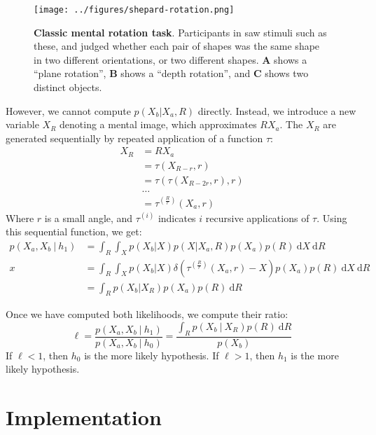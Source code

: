 \documentclass{article} %
\begin{document}
\begin{figure}[t]
  \centering
  \texttt{[image: ../figures/shepard-rotation.png]}
  \caption{\textbf{Classic mental rotation task}. Participants in
    \cite{Shepard1971} saw stimuli such as these, and judged whether
    each pair of shapes was the same shape in two different
    orientations, or two different shapes. \textbf{A} shows a ``plane
    rotation'', \textbf{B} shows a ``depth rotation'', and \textbf{C}
    shows two distinct objects.}
  \label{fig:mental-rotation}
\end{figure}

However, we cannot compute $p(X_b\vert X_a, R)$ directly. Instead, we
introduce a new variable $X_R$ denoting a mental image, which
approximates $RX_a$. The $X_R$ are generated sequentially by repeated
application of a function $\tau$:
\begin{align}
  X_R&=RX_a\nonumber \\
  &=\tau(X_{R-r}, r)\nonumber \\
  &=\tau(\tau(X_{R-2r}, r), r)\nonumber \\
  &\ldots{}\nonumber \\
  &=\tau^{(\frac{R}{r})}(X_a, r)
  \label{eq:tau}
\end{align} 
Where $r$ is a small angle, and $\tau^{(i)}$ indicates $i$ recursive
applications of $\tau$. Using this sequential function, we get:
\begin{align}
  p(X_a, X_b\ \vert \ h_1)&=\int_R \int_{X} p(X_b\vert X) p(X\vert X_a, R)p(X_a)p(R)\ \mathrm{d}X\ \mathrm{d}R \nonumber \\
  x&= \int_R \int_X p(X_b\vert X)\delta(\tau^{(\frac{R}{r})}(X_a, r)-X)p(X_a)p(R)\ \mathrm{d}X\ \mathrm{d}R \nonumber \\
  &= \int_R p(X_b\vert X_R)p(X_a)p(R)\ \mathrm{d}R
  \label{eq:lh-h1}
\end{align}

Once we have computed both likelihoods, we compute their ratio:
\begin{equation}
  \ell=\frac{p(X_a, X_b\ \vert \ h_1)}{p(X_a, X_b\ \vert \ h_0)}=\frac{\int_R p(X_b\ \vert\ X_R)p(R)\ \mathrm{d}R}{p(X_b)}
  \label{eq:lh-ratio}
\end{equation}
If $\ell<1$, then $h_0$ is the more likely hypothesis. If $\ell>1$,
then $h_1$ is the more likely hypothesis.

\section{Implementation}
\end{document}
